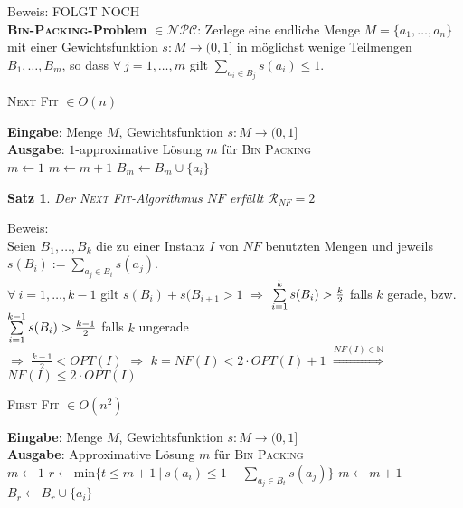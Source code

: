 \documentclass[a4paper,10pt]{scrartcl}
\newcommand{\tbf}{\textbf}
\newcommand{\tsc}{\textsc}
\newcommand{\Ra}{\Rightarrow}
\newcommand{\agn}{\leftarrow}
\newcommand{\nat}{\mathbb{N}}
\newcommand{\NPC}{\mathcal{NPC}}
\newcommand{\calR}{\mathcal{R}}
\newcommand{\Eingabe}[1]{\STATE \tbf{Eingabe}: #1 \\}
\newcommand{\Ausgabe}[1]{\STATE \tbf{Ausgabe}: #1 \\}
\newtheorem{satz}{Satz}
\begin{document}
Beweis: FOLGT NOCH \\

\tbf{\tsc{Bin-Packing}-Problem} $\in \NPC$: Zerlege eine endliche Menge $M = \{a_1, \ldots, a_n\}$ mit einer Gewichtsfunktion $s: M \rightarrow (0,1]$ in möglichst wenige Teilmengen $B_1, \ldots, B_m$, so dass $\forall \ j = 1, \ldots, m$ gilt  $\sum_{a_i \in B_j} \limits s(a_i) \leq 1$. \\

\begin{algorithm}
\caption{\tsc{Next Fit} $\in O(n)$}
\begin{algorithmic}
\Eingabe{Menge $M$, Gewichtsfunktion $s: M \rightarrow (0,1]$}
\Ausgabe{$1$-approximative Lösung $m$ für \tsc{Bin Packing}}
\STATE $m \agn 1$
		\STATE $m \agn m + 1$	
	\ENDIF
	\STATE $B_m \agn B_m \cup \{a_i\}$
\ENDFOR
\end{algorithmic}
\end{algorithm}

\begin{satz}
 Der \tsc{Next Fit}-Algorithmus $NF$ erfüllt $\calR_{NF} = 2$
\end{satz}

Beweis: \\
Seien $B_1, \ldots, B_k$ die zu einer Instanz $I$ von $NF$ benutzten Mengen und jeweils $s(B_i) := \sum_{a_j \in B_i} \limits s(a_j)$. \\
$\forall \ i = 1, \ldots, k - 1$ gilt $s(B_i) + s(B_{i+1} > 1$ $\Ra$ $\sum_{i=1}^k \limits s(B_i) > \frac{k}{2}$ falls $k$ gerade, bzw. $\sum_{i=1}^{k-1} \limits s(B_i) > \frac{k - 1}{2}$ falls $k$ ungerade \\
$\Ra$ $\frac{k-1}{2} < OPT(I)$ $\Ra$ $k = NF(I) < 2 \cdot OPT(I) + 1$ $\overset{NF(I) \in \nat}{\Longrightarrow}$ $NF(I) \leq 2 \cdot OPT(I)$ \\

\begin{algorithm}
\caption{\tsc{First Fit} $\in O(n^2)$}
\begin{algorithmic}
\Eingabe{Menge $M$, Gewichtsfunktion $s: M \rightarrow (0,1]$}
\Ausgabe{Approximative Lösung $m$ für \tsc{Bin Packing}}
\STATE $m \agn 1$
	\STATE $r \agn \text{min}\{ t \leq m + 1 \ | \ s(a_i) \leq 1 - \sum_{a_j \in B_t} s(a_j) \}$
		\STATE $m \agn m + 1$	
	\ENDIF
	\STATE $B_r \agn B_r \cup \{a_i\}$
\ENDFOR
\end{algorithmic}
\end{algorithm}
\end{document}
